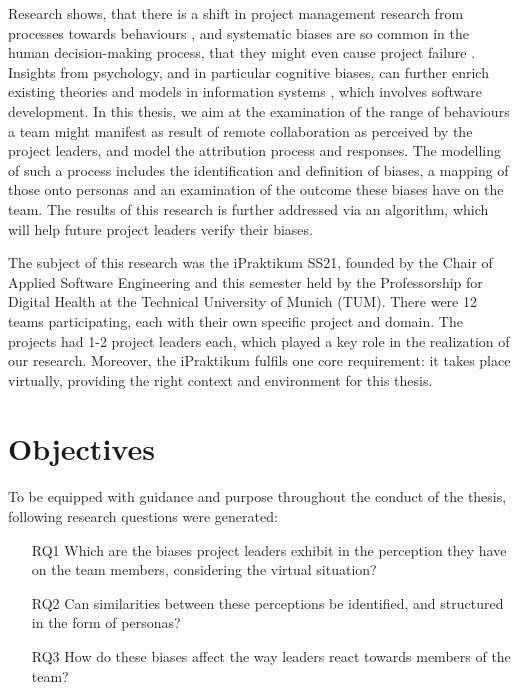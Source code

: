 Research shows, that there is a shift in project management research from processes towards behaviours \cite{Leybourne2007}, and systematic biases are so common in the human decision-making process, that they might even cause project failure \cite{Shore2008}. Insights from  psychology, and in particular cognitive biases, can further enrich existing theories and models in information systems \cite{Fleischmann2014}, which involves software development. In this thesis, we aim at the examination of the range of behaviours a team might manifest as result of remote collaboration as perceived by the project leaders, and model the attribution process and responses. The modelling of such a process includes the identification and definition of biases, a mapping of those onto personas and an examination of the outcome these biases have on the team. The results of this research is further addressed via an algorithm, which will help future project leaders verify their biases.

The subject of this research was the iPraktikum SS21, founded by the Chair of Applied Software Engineering and this semester held by the Professorship for Digital Health at the Technical University of Munich (TUM). There were 12 teams participating, each with their own specific project and domain. The projects had 1-2 project leaders each, which played a key role in the realization of our research. Moreover, the iPraktikum fulfils one core requirement: it takes place virtually, providing the right context and environment for this thesis.


\section{Objectives}


To be equipped with guidance and purpose throughout the conduct of the thesis, following research questions were generated:
\begin{itemize}
	\item [RQ1] Which are the biases project leaders exhibit in the perception they have on the team members, considering the virtual situation?
	\item [RQ2] Can similarities between these perceptions be identified, and structured in the form of personas?
	\item [RQ3] How do these biases affect the way leaders react towards members of the team?
\end{itemize}

